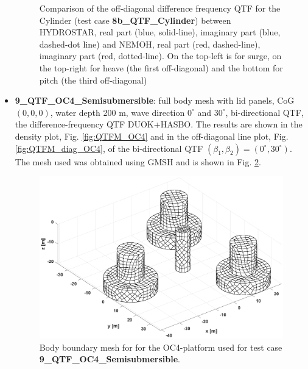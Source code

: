 \documentclass[12pt,a4paper,titlepage]{article}
\begin{document}
\begin{itemize}
\begin{figure}[h!tbp]
{}
	\caption{Comparison of the off-diagonal difference frequency QTF for the Cylinder (test case \textbf{8b\_QTF\_Cylinder}) between HYDROSTAR, real part (blue, solid-line), imaginary part (blue, dashed-dot line) and NEMOH, real part (red, dashed-line), imaginary part (red, dotted-line). On the top-left is for surge, on the top-right for heave (the first off-diagonal) and the bottom for pitch (the third off-diagonal)}\label{fig:QTFM_diag_Cylinder}
\end{figure}

\item \textbf{9\_QTF\_OC4\_Semisubmersible}: full body mesh with lid panels, CoG $(0,0,0)$, water depth 200 m, wave direction $0^{\circ}$ and $30^{\circ}$, bi-directional QTF, the difference-frequency QTF DUOK+HASBO. The results are shown in the density plot, Fig. \ref{fig:QTFM_OC4} and in the off-diagonal line plot, Fig. \ref{fig:QTFM_diag_OC4}, of the bi-directional QTF $(\beta_1,\beta_2)=(0^{\circ},30^{\circ})$. The mesh used was obtained using GMSH \cite{gmsh} and is shown in Fig. \ref{fig:meshesOC4}.

\begin{figure}[h!tbp]
\centering
\includegraphics[scale=0.5,trim = 50mm 15mm 50mm 18mm, clip]{figures/OC4/bodymesh.eps}	
\caption{Body boundary mesh for for the OC4-platform used for test case \textbf{9\_QTF\_OC4\_Semisubmersible}.}\label{fig:meshesOC4}
\end{figure}




\end{itemize}
\end{document}
